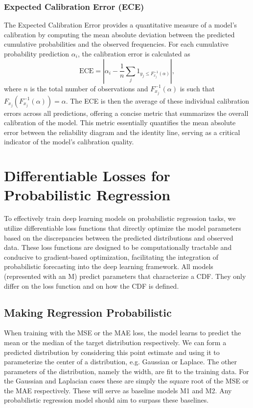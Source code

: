 \documentclass{article}
\begin{document}
\subsubsection{Expected Calibration Error (ECE)}
The Expected Calibration Error provides a quantitative measure of a model's calibration by computing the mean absolute deviation between the predicted cumulative probabilities and the observed frequencies. For each cumulative probability prediction $\alpha_i$, the calibration error is calculated as
\begin{equation}
    \text{ECE}=|\alpha_i - \frac{1}{n}\sum_{j} \mathrm{1}_{y_j \leq F^{-1}_{x_j}(\alpha)}|,
\end{equation}
where $n$ is the total number of observations and $F^{-1}_{x_j}(\alpha)$ is such that $ F_{x_j}(F^{-1}_{x_j}(\alpha)) = \alpha$.
The ECE is then the average of these individual calibration errors across all predictions, offering a concise metric that summarizes the overall calibration of the model. This metric essentially quantifies the mean absolute error between the reliability diagram and the identity line, serving as a critical indicator of the model's calibration quality.


\section{Differentiable Losses for Probabilistic Regression}
To effectively train deep learning models on probabilistic regression tasks, we utilize differentiable loss functions that directly optimize the model parameters based on the discrepancies between the predicted distributions and observed data. These loss functions are designed to be computationally tractable and conducive to gradient-based optimization, facilitating the integration of probabilistic forecasting into the deep learning framework. All models (represented with an M) predict parameters that characterize a CDF. They only differ on the loss function and on how the CDF is defined. 

\subsection{Making Regression Probabilistic}
When training with the MSE or the MAE loss, the model learns to predict the mean or the median of the target distribution respectively. We can form a predicted distribution by considering this point estimate and using it to parameterize the center of a distribution, e.g. Gaussian or Laplace. The other parameters of the distribution, namely the width, are fit to the training data. For the Gaussian and Laplacian cases these are simply the square root of the MSE or the MAE respectively. These will serve as baseline models M1 and M2. Any probabilistic regression model should aim to surpass these baselines.
\end{document}
